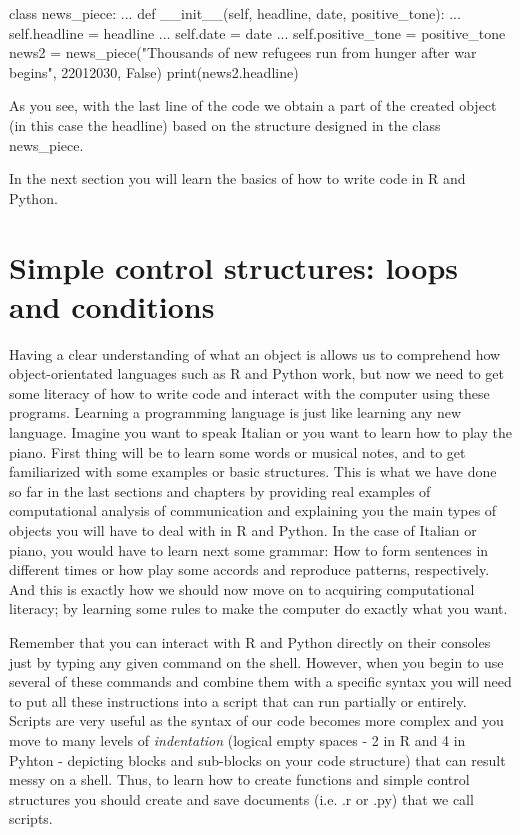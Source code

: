 \begin{examplepy}
class news_piece:
...     def __init__(self, headline, date, positive_tone):
...             self.headline = headline
...             self.date = date
...             self.positive_tone = positive_tone
news2 = news_piece("Thousands of new refugees run from hunger after war begins", 22012030, False)
print(news2.headline)
\end{examplepy}

As you see, with the last line of the code we obtain a part of the created object (in this case the headline) based on the structure designed in the class news\_piece.

In the next section you will learn the basics of how to write code in R and Python.

\section{Simple control structures: loops and conditions}	

Having a clear understanding of what an object is allows us to comprehend how object-orientated languages such as R and Python work, but now we need to get some literacy of how to write code and interact with the computer using these programs. Learning a programming language is just like learning any new language.  Imagine you want to speak Italian or you want to learn how to play the piano. First thing will be to learn some words or musical notes, and to get familiarized with some examples or basic structures. This is what we have done so far in the last sections and chapters by providing real examples of computational analysis of communication and explaining you the main types of objects you will have to deal with in R and Python. In the case of Italian or piano, you would have to learn next some grammar: How to form sentences in different times or how play some accords and reproduce patterns, respectively. And this is exactly how we should now move on to acquiring computational literacy; by learning some rules to make the computer do exactly  what you want.

Remember that you can interact with R and Python directly on their consoles just by typing any given command on the shell. However, when you begin to use several of these commands and combine them with a specific syntax you will need to put all these instructions into a script that can run partially or entirely. Scripts are very useful as the syntax of our code becomes more complex and you move to many levels of \emph{indentation} (logical empty spaces - 2 in R and 4 in Pyhton - depicting blocks and sub-blocks on your code structure) that can result messy on a shell. Thus, to learn how to create functions and simple control structures you should create and save documents (i.e. .r or .py) that we call scripts. 

